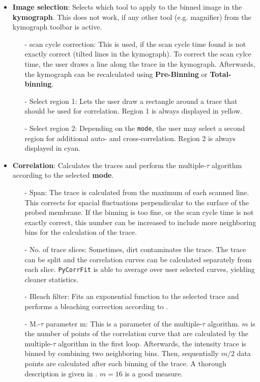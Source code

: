 \begin{itemize}
\item  \textbf{Image selection}: Selects which tool to apply to the binned image in the \textbf{kymograph}. This does not work, if any other tool (e.g. magnifier) from the kymograph toolbar is active.
	\begin{itemize}
	\item[-] scan cycle correction: This is used, if the scan cycle time found is not exactly correct (tilted lines in the kymograph). To correct the scan cylce time, the user draws a line along the trace in the kymograph. Afterwards, the kymograph can be recalculated using \textbf{Pre-Binning} or \textbf{Total-binning}.
	\item[-] Select region 1: Lets the user draw a rectangle around a trace that should be used for correlation. Region 1 is always displayed in yellow.
	\item[-] Select region 2: Depending on the \texttt{mode}, the user may select a second region for additional auto- and cross-correlation. Region 2 is always displayed in cyan.
	\end{itemize}
	
\item \textbf{Correlation}: Calculates the traces and perform the multiple-$\tau$ algorithm according to the selected \textbf{mode}. 
	\begin{itemize}
	\item[-] Span: The trace is calculated from the maximum of each scanned line. This corrects for spacial fluctuations perpendicular to the surface of the probed membrane. If the binning is too fine, or the scan cycle time is not exactly correct, this number can be increased to include more neighboring bins for the calculation of the trace.
	\item[-] No. of trace slices: Sometimes, dirt contaminates the trace. The trace can be split and the correlation curves can be calculated separately from each slice. \texttt{PyCorrFit} is able to average over user selected curves, yielding cleaner statistics.
	\item[-] Bleach filter: Fits an exponential function to the selected trace and performs a bleaching correction according to \cite{Ries2009}.
	
	\item[-] M.-$\tau$ parameter m: This is a parameter of the multiple-$\tau$ algorithm. $m$ is the number of points of the correlation curve that are calculated by the multiple-$\tau$ algorithm in the first loop. Afterwards, the intensity trace is binned by combining two neighboring bins. Then, sequentially $m/2$ data points are calculated after each binning of the trace. A thorough description is given in \cite{Wohland2001}. $m=16$ is a good measure.


\end{itemize}
\end{itemize}
